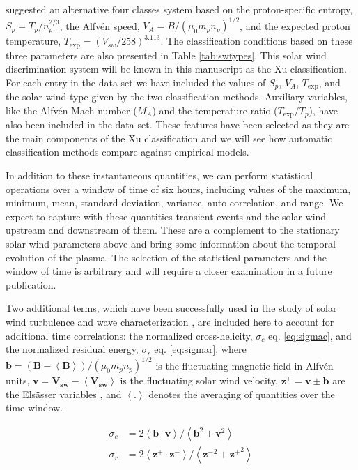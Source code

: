 \citep{Xu2015b} suggested an alternative four classes system based on the proton-specific entropy, $S_p = T_p/n_p^{2/3}$, the Alfv\'en speed, $V_A = B / (\mu_0 m_p n_p)^{1/2}$, and the expected proton temperature, $T_\text{exp} = (V_{sw}/258)^{3.113}$. The classification conditions based on these three parameters are also presented in Table \ref{tab:swtypes}. This solar wind discrimination system will be known in this manuscript as the Xu classification\citep{Xu2015b}. For each entry in the data set we have included the values of $S_p$, $V_A$, $T_\text{exp}$, and the solar wind type given by the two classification methods. Auxiliary variables, like the Alfv\'en Mach number ($M_A$) and the temperature ratio ($T_\text{exp}/T_p$), have also been included in the data set. These features have been selected as they are the main components of the Xu classification and we will see how automatic classification methods compare against empirical models.

In addition to these instantaneous quantities, we can perform statistical operations over a window of time of six hours, including values of the maximum, minimum, mean, standard deviation, variance, auto-correlation, and range. We expect to capture with these quantities transient events and the solar wind upstream and downstream of them. These are a complement to the stationary solar wind parameters above and bring some information about the temporal evolution of the plasma. The selection of the statistical parameters and the window of time is arbitrary and will require a closer examination in a future publication.

Two additional terms, which have been successfully used in the study of solar wind turbulence and wave characterization \citep{Zhao2018,Adhikari2020,Magyar2019,DAmicis2015}, are included here to account for additional time correlations: the normalized cross-helicity, $\sigma_c$ eq. \eqref{eq:sigmac}, and the normalized residual energy, $\sigma_r$ eq. \eqref{eq:sigmar}, where $\boldsymbol{b} = \left(\boldsymbol{B}- \boldsymbol{\left<B\right>}\right)/(\mu_0m_pn_p)^{1/2}$ is the fluctuating magnetic field in Alfv\'en units, $\boldsymbol{v} = \boldsymbol{V_{sw}}- \boldsymbol{\left<V_{sw}\right>}$ is the fluctuating solar wind velocity, $\boldsymbol{z^\pm} = \boldsymbol{v} \pm \boldsymbol{b}$ are the Els\"asser variables \citep{PhysRev.79.183}, and $\left<.\right>$ denotes the averaging of quantities over the time window.

\begin{align}
\sigma_c & = 2 \left< \boldsymbol{b}\cdot\boldsymbol{v}\right>/\left<\boldsymbol{b}^2 + \boldsymbol{v}^2\right> \label{eq:sigmac} \\
\sigma_r & = 2 \left< \boldsymbol{z^+}\cdot\boldsymbol{z^-}\right>/\left<\boldsymbol{z^-}^2 + \boldsymbol{z^+}^2\right> \label{eq:sigmar}
\end{align}

